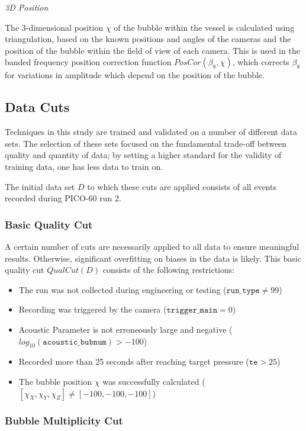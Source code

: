 \documentclass[10pt]{article}
\begin{document}
\textit{3D Position}

The 3-dimensional position $\chi$ of the bubble within the vessel is calculated using triangulation, based on the known positions and angles of the cameras and the position of the bubble within the field of view of each camera. This is used in the banded frequency position correction function $PosCor(\beta _{8}, \chi)$, which corrects $\beta _{8}$ for variations in amplitude which depend on the position of the bubble.

\subsection{Data Cuts}

Techniques in this study are trained and validated on a number of different data sets. The selection of these sets focused on the fundamental trade-off between quality and quantity of data; by setting a higher standard for the validity of training data, one has less data to train on.

The initial data set $D$ to which these cuts are applied consists of all events recorded during PICO-60 run 2.

\subsubsection{Basic Quality Cut}

A certain number of cuts are necessarily applied to all data to ensure meaningful results. Otherwise, significant overfitting on biases in the data is likely. This basic quality cut $QualCut(D)$ consists of the following restrictions:

\begin{itemize}
    \item The run was not collected during engineering or testing ($\texttt{run\_type}\neq99$)
    \item Recording was triggered by the camera ($\texttt{trigger\_main}=0$)
    \item Acoustic Parameter is not erroneously large and negative ($log_{10}(\texttt{acoustic\_bubnum})>-100$)
    \item Recorded more than 25 seconds after reaching target pressure ($\texttt{te}>25$)
    \item The bubble position $\chi$ was successfully calculated ($[\chi_{X}, \chi_{Y}, \chi_{Z}]\neq[-100, -100, -100]$)
\end{itemize}

\subsubsection{Bubble Multiplicity Cut}
\end{document}
